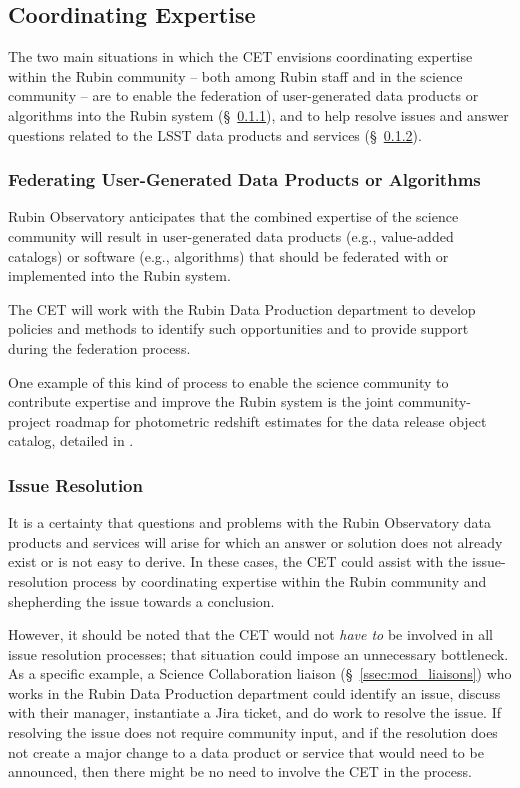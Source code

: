 \documentclass[DM,lsstdraft,toc]{lsstdoc}
\begin{document}
\subsection{Coordinating Expertise}\label{ssec:mod_coord}

The two main situations in which the CET envisions coordinating expertise within the Rubin community -- both among Rubin staff and in the science community -- are to enable the federation of user-generated data products or algorithms into the Rubin system (\S~\ref{sssec:mod_coord_ug}), and to help resolve issues and answer questions related to the LSST data products and services (\S~\ref{sssec:mod_coord_res}).


\subsubsection{Federating User-Generated Data Products or Algorithms}\label{sssec:mod_coord_ug}

Rubin Observatory anticipates that the combined expertise of the science community will result in user-generated data products (e.g., value-added catalogs) or software (e.g., algorithms) that should be federated with or implemented into the Rubin system.

The CET will work with the Rubin Data Production department to develop policies and methods to identify such opportunities and to provide support during the federation process.

One example of this kind of process to enable the science community to contribute expertise and improve the Rubin system is the joint community-project roadmap for photometric redshift estimates for the data release object catalog, detailed in .


\subsubsection{Issue Resolution}\label{sssec:mod_coord_res}

It is a certainty that questions and problems with the Rubin Observatory data products and services will arise for which an answer or solution does not already exist or is not easy to derive. 
In these cases, the CET could assist with the issue-resolution process by coordinating expertise within the Rubin community and shepherding the issue towards a conclusion.

However, it should be noted that the CET would not \textit{have to} be involved in all issue resolution processes; that situation could impose an unnecessary bottleneck.
As a specific example, a Science Collaboration liaison (\S~\ref{ssec:mod_liaisons}) who works in the Rubin Data Production department could identify an issue, discuss with their manager, instantiate a Jira ticket, and do work to resolve the issue.
If resolving the issue does not require community input, and if the resolution does not create a major change to a data product or service that would need to be announced, then there might be no need to involve the CET in the process.
\end{document}
